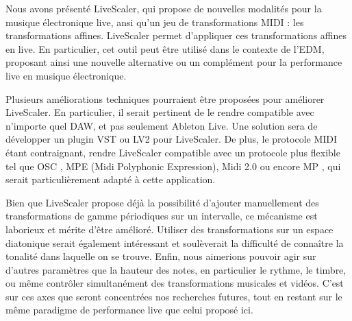 Nous avons présenté LiveScaler, qui propose de nouvelles modalités pour la musique électronique live, ansi qu'un jeu de transformations MIDI : les transformations affines.  Live\-Scaler permet d'appliquer ces transformations affines en live. En particulier, cet outil peut être utilisé dans le contexte de l'EDM, proposant ainsi une nouvelle alternative ou un complément pour la performance live en musique électronique.

Plusieurs améliorations techniques pourraient être proposées pour améliorer LiveScaler. En particulier, il serait pertinent de le rendre compatible avec n'importe quel DAW, et pas seulement Ableton Live. Une solution sera de  développer un plugin VST ou LV2 pour LiveScaler. De plus, le protocole MIDI étant contraignant, rendre LiveScaler compatible avec un protocole plus flexible tel que OSC \cite{wright2005open}, MPE (Midi Polyphonic Expression), Midi 2.0 ou encore  MP \cite{goudard2017mapping}, qui serait particulièrement adapté à cette application.

Bien que LiveScaler propose déjà la possibilité d'ajouter manuellement des transformations de gamme périodiques sur un intervalle, ce mécanisme est laborieux et mérite d'être amélioré. Utiliser des transformations sur un espace diatonique serait également intéressant et soulèverait la difficulté de connaître la tonalité dans laquelle on se trouve. Enfin, nous aimerions pouvoir agir sur d'autres paramètres que la hauteur des notes, en particulier le rythme, le timbre, ou même contrôler simultanément des transformations musicales et vidéos. C'est sur ces axes que seront concentrées nos recherches futures, tout en restant sur le même paradigme de performance live que celui proposé ici.
